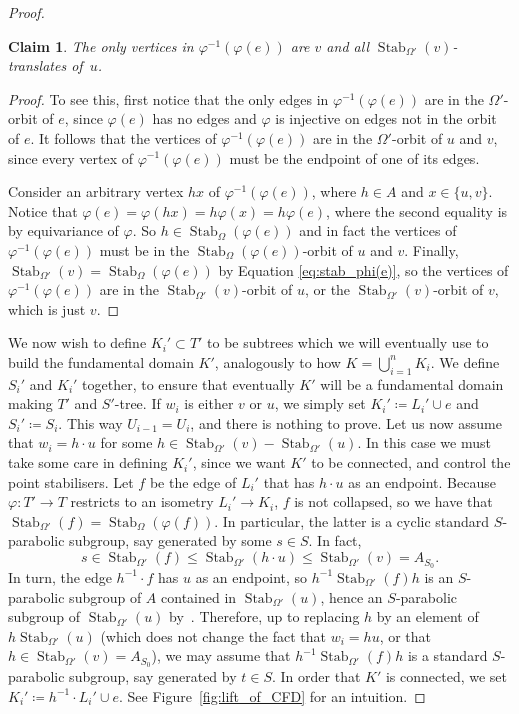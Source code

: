 \documentclass[svgnames]{amsart}
\theoremstyle{plain}
\newtheorem{claim}[thm]{Claim}
\theoremstyle{definition}
\newenvironment{claimproof}{\renewcommand{\qedsymbol}{$\blacksquare$}\begin{proof}}{\end{proof}}
\newcommand{\Stab}[2]{\operatorname{Stab}_{#1}\left(#2\right)}
\renewcommand{\phi}{\varphi}
\begin{document}
\begin{proof}
    \begin{claim}\label{claim:preimage_phi_e}
        The only vertices in $\phi^{-1}(\phi(e))$ are $v$ and all $\Stab{\Omega'}{v}$-translates of~$u$.
    \end{claim}
    \begin{claimproof}
         To see this, first notice that the only edges in $\phi^{-1}(\phi(e))$ are in the $\Omega'$-orbit of $e$, since $\phi(e)$ has no edges and $\phi$ is injective on edges not in the orbit of $e$. It follows that the vertices of $\phi^{-1}(\phi(e))$ are in the $\Omega'$-orbit of $u$ and $v$, since every vertex of $\phi^{-1}(\phi(e))$ must be the endpoint of one of its edges.
         
         Consider an arbitrary vertex $hx$ of $\phi^{-1}(\phi(e))$, where $h \in A$ and $x \in \{u, v\}$. Notice that $\phi(e) = \phi(hx) = h\phi(x) = h\phi(e)$, where the second equality is by equivariance of $\phi$. So $h \in \Stab{\Omega}{\phi(e)}$ and in fact the vertices of $\phi^{-1}(\phi(e))$ must be in the $\Stab{\Omega}{\phi(e)}$-orbit of $u$ and $v$. Finally, $\Stab{\Omega'}{v}=\Stab{\Omega}{\phi(e)}$ by Equation \eqref{eq:stab_phi(e)}, so the vertices of $\phi^{-1}(\phi(e))$ are in the $\Stab{\Omega'}{v}$-orbit of $u$, or the $\Stab{\Omega'}{v}$-orbit of $v$, which is just $v$.
    \end{claimproof}
    
    We now wish to define $K_i' \subset T'$ to be subtrees which we will eventually use to build the fundamental domain $K'$, analogously to how $K = \bigcup_{i=1}^n K_i$. We define $S_i'$ and $K_i'$ together, to ensure that eventually $K'$ will be a fundamental domain making $T'$ and $S'$-tree. If $w_i$ is either $v$ or $u$, we simply set $K_i'\coloneqq L_i'\cup e$ and $S_i'\coloneqq S_i$. This way $U_{i-1}=U_{i}$, and there is nothing to prove. Let us now assume that $w_i=h\cdot u$ for some $h\in\Stab{\Omega'}{v}-\Stab{\Omega'}{u}$. In this case we must take some care in defining $K_i'$, since we want $K'$ to be connected, and control the point stabilisers.  Let $f$ be the edge of $L_i'$ that has $h\cdot u$ as an endpoint. Because $\phi\colon T'\to T$ restricts to an isometry $L_i'\to K_i$, $f$ is not collapsed, so we have that $\Stab{\Omega'}{f}=\Stab{\Omega}{\phi(f)}$. In particular, the latter is a cyclic standard $S$-parabolic subgroup, say generated by some $s\in S$. In fact, $$s \in \Stab{\Omega'}{f} \leq \Stab{\Omega'}{h \cdot u} \leq \Stab{\Omega'}{v} = A_{S_0}.$$ In turn, the edge $h^{-1}\cdot f$ has $u$ as an endpoint, so $h^{-1}\Stab{\Omega'}{f}h$ is an $S$-parabolic subgroup of $A$ contained in $\Stab{\Omega'}{u}$, hence an $S$-parabolic subgroup of $\Stab{\Omega'}{u}$ by~\cite[Theorem 1.1]{blufstein2023parabolic}. Therefore, up to replacing $h$ by an element of $h\Stab {\Omega'}{u}$ (which does not change the fact that $w_i=hu$, or that $h \in \Stab{\Omega'}{v} = A_{S_0}$), we may assume that $h^{-1}\Stab{\Omega'}{f}h$ is a standard $S$-parabolic subgroup, say generated by $t\in S$. In order that $K'$ is connected, we set $K_i'\coloneqq h^{-1}\cdot L_i'\cup e$. See Figure~\ref{fig:lift_of_CFD} for an intuition.


\end{proof}
\end{document}

